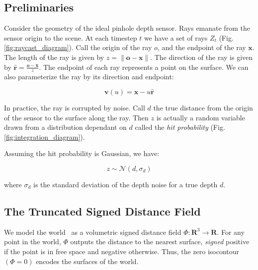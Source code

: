 \documentclass[10pt,twocolumn,letterpaper]{article}
\newcommand{\figref}[1]{Fig.\ref{#1}}
\begin{document}
\subsection{Preliminaries}
\label{section:prelim}
Consider the geometry of the ideal pinhole depth sensor. Rays emanate from the
sensor origin to the scene. At each timestep $t$ we have a set of rays
$Z_t$ (\figref{fig:raycast_diagram}). Call the origin of the ray $o$, and the
endpoint of the ray $\mathbf{x}$. 
The length of the ray is given by $z = \|\mathbf{o}
- \mathbf{x}\|$. The direction of the ray is given by $\mathbf{\hat{r}} =
\frac{\mathbf{o} - \mathbf{x}}{z}$. The endpoint of each ray represents a point
on the surface.  We can also parameterize the ray by its direction and endpoint: 

 \begin{equation}
 	\mathbf{v}(u) = \mathbf{x} - u\mathbf{\hat{r}}
 \end{equation}

In practice, the ray is corrupted by noise. Call $d$ the true
distance from the origin of the sensor to the surface along the ray. Then $z$
is actually a random variable drawn from a distribution dependant on $d$ called
the \textit{hit probability} (\figref{fig:integration_diagram}). 

Assuming the hit probability is Gaussian, we have:

\begin{equation}
\label{eqn:hitprobability}
z \sim \mathcal{N}(d, \sigma_d)
\end{equation}

\noindent where $\sigma_d$ is the standard deviation of the depth noise for a
true depth $d$.


\subsection{The Truncated Signed Distance Field}
\label{section:TSDF}
We model the world~\cite{Curless1996} as a volumetric signed distance field $\Phi: \mathbf{R}^3
\to \mathbf{R}$. For any point in the world, $\Phi$
outputs the distance to the nearest surface, \emph{signed} positive if the point
is in free space and negative otherwise. Thus, the zero isocontour $(\Phi = 0)$
encodes the surfaces of the world.
\end{document}
